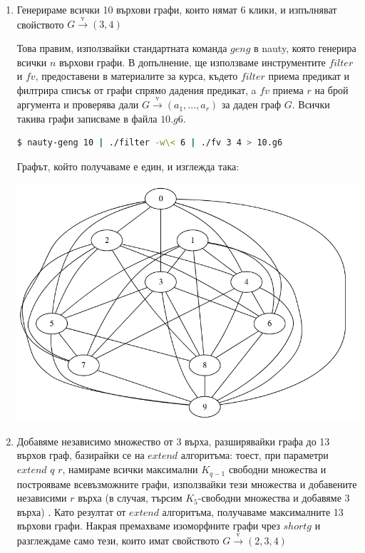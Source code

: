 \documentclass[letterpaper,12pt]{article}
\theoremstyle{definition}
\begin{document}
\begin{enumerate}[Стъпка 1:]
\item Генерираме всички 10 върхови графи, които нямат 6 клики, и изпълняват свойството $G \xrightarrow{\text{v}} (3, 4)$

Това правим, използвайки стандартната команда $geng$ в nauty, която генерира всички $n$ върхови графи. В допълнение, ще използваме инструментите $filter$ и $fv$, предоставени в материалите за курса, където $filter$ приема предикат и филтрира списък от графи спрямо дадения предикат, a $fv$ приема $r$ на брой аргумента и проверява дали $G \xrightarrow{\text{v}} (a_1, ..., a_r)$ за даден граф $G$. Всички такива графи записваме в файла $10.g6$.

\begin{lstlisting}[language=bash]
$ nauty-geng 10 | ./filter -w\< 6 | ./fv 3 4 > 10.g6
\end{lstlisting}

Графът, който получаваме е един, и изглежда така:

\includegraphics[scale=0.45]{10.png}

\item Добавяме независимо множество от 3 върха, разширявайки графа до 13 върхов граф, базирайки се на $extend$ алгоритъма: тоест, при параметри $extend$ $q$ $r$, намираме всички максимални $K_{q-1}$ свободни множества и построяваме всевъзможните графи, използвайки тези множества и добавените независими $r$ върха (в случая, търсим $K_5$-свободни множества и добавяме 3 върха) . Като резултат от $extend$ алгоритъма, получаваме максималните 13 върхови графи. Накрая премахваме изоморфните графи чрез $shortg$ и разглеждаме само тези, които имат свойството $G\xrightarrow{\text{v}} (2, 3, 4)$


\end{enumerate}
\end{document}
